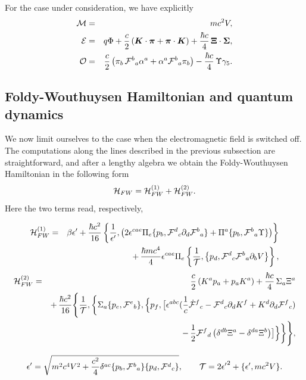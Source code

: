 \documentclass[preprint,showpacs,preprintnumbers,eqsecnum,amsmath,amssymb]{revtex4-1}
\begin{document}
For the case under consideration, we have explicitly
\begin{eqnarray}
{\cal M} &=& mc^2V,\\
{\cal E} &=& q\Phi + {\frac c2}\left(\bm{K}\cdot\bm{\pi} +
\bm{\pi}\cdot\bm{K}\right) + {\frac {\hbar c}4}\,\bm{\Xi}\cdot\bm{\Sigma},\\
{\cal O} &=& {\frac c 2}\left(\pi_b\,{\cal F}^b{}_a \alpha^a + \alpha^a
{\cal F}^b{}_a\pi_b\right) - {\frac {\hbar c}4}\,\Upsilon\gamma_5.
\end{eqnarray}

\subsection{Foldy-Wouthuysen Hamiltonian and quantum dynamics}

We now limit ourselves to the case when the electromagnetic field is switched off.
The computations along the lines described in the previous subsection are
straightforward, and after a lengthy algebra we obtain the Foldy-Wouthuysen
Hamiltonian in the following form
\begin{equation}
{\cal H}_{FW}={\cal H}_{FW}^{(1)}+{\cal H}_{FW}^{(2)}.\label{eqFW}
\end{equation}
Here the two terms read, respectively, 
\begin{widetext}
\begin{eqnarray}
{\cal H}_{FW}^{(1)} &=& \beta\epsilon' + \frac{\hbar c^2}{16}\left\{
\frac{1}{\epsilon'},\left(2\epsilon^{cae}\Pi_e \{p_b,{\cal F}^d{}_c\partial_d
{\cal F}^b{}_a\}+\Pi^a\{p_b,{\cal F}^b{}_a\Upsilon\}\right)\right\}\nonumber\\
&& +\,\frac{\hbar mc^4}{4}\epsilon^{cae}\Pi_e\left\{\frac{1}{{\cal T}},\left\{
p_d,{\cal F}^d{}_c{\cal F}^b{}_a\partial_bV\right\}\right\},\label{eq7}
\end{eqnarray}
\begin{eqnarray}
{\cal H}_{FW}^{(2)} &=& \frac c2\left(K^a p_a + p_a K^a\right)
+ {\frac {\hbar c}4}\,\Sigma_a\Xi^a\nonumber\\
&& +\,\frac{\hbar c^2}{16}\Biggl\{\frac{1}{{\cal
T}},\biggl\{\Sigma_a \{p_e,{\cal
F}^e{}_b\},\Bigl\{p_f,\bigl[\epsilon^{abc}({\frac 1c} \dot{\cal
F}^f{}_c - {\cal F}^d{}_c\partial_dK^f + K^d\partial_d{\cal
F}^f{}_c)\nonumber\\
&& -\,{\frac 12}{\cal F}^f{}_d\left(\delta^{db}\Xi^a -
\delta^{da}\Xi^b\right) \bigr]\Bigr\}\biggr\}\Biggr\},\label{eq7K}
\end{eqnarray}
\end{widetext}
\begin{equation}\label{eqa}
\epsilon'=\sqrt{m^2c^4V^2+\frac{c^2}{4}\delta^{ac}\{p_b,{\cal F}^b{}_a\}
\{p_d,{\cal F}^d{}_c\}},\qquad {\cal T}=2{\epsilon'}^2 + \{\epsilon',mc^2V\}.
\end{equation}
\end{document}
